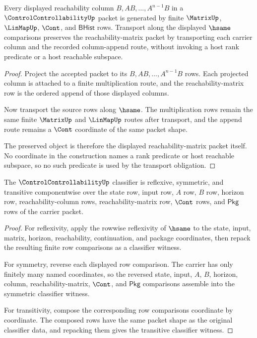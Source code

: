 \begin{theorem}
\label{thm:controlcontrollability-column-transport-obligation}
Every displayed reachability column $B,AB,\ldots,A^{n-1}B$ in a $\ControlControllabilityUp$ packet is generated by finite $\MatrixUp$, $\LinMapUp$, $\Cont$, and $\mathsf{BHist}$ rows. Transport along the displayed $\hsame$ comparisons preserves the reachability-matrix packet by transporting each carrier column and the recorded column-append route, without invoking a host rank predicate or a host reachable subspace.
\end{theorem}
\begin{proof}
Project the accepted packet to its $B,AB,\ldots,A^{n-1}B$ rows. Each projected column is attached to a finite multiplication route, and the reachability-matrix row is the ordered append of those displayed columns.

Now transport the source rows along $\hsame$. The multiplication rows remain the same finite $\MatrixUp$ and $\LinMapUp$ routes after transport, and the append route remains a $\Cont$ coordinate of the same packet shape.

The preserved object is therefore the displayed reachability-matrix packet itself. No coordinate in the construction names a rank predicate or host reachable subspace, so no such predicate is used by the transport obligation.
\end{proof}

\begin{theorem}
\label{thm:controlcontrollability-classifier-stability-obligation}
The $\ControlControllabilityUp$ classifier is reflexive, symmetric, and transitive componentwise over the state row, input row, $A$ row, $B$ row, horizon row, reachability-column rows, reachability-matrix row, $\Cont$ rows, and $\mathsf{Pkg}$ rows of the carrier packet.
\end{theorem}
\begin{proof}
For reflexivity, apply the rowwise reflexivity of $\hsame$ to the state, input, matrix, horizon, reachability, continuation, and package coordinates, then repack the resulting finite row comparisons as a classifier witness.

For symmetry, reverse each displayed row comparison. The carrier has only finitely many named coordinates, so the reversed state, input, $A$, $B$, horizon, column, reachability-matrix, $\Cont$, and $\mathsf{Pkg}$ comparisons assemble into the symmetric classifier witness.

For transitivity, compose the corresponding row comparisons coordinate by coordinate. The composed rows have the same packet shape as the original classifier data, and repacking them gives the transitive classifier witness.
\end{proof}


